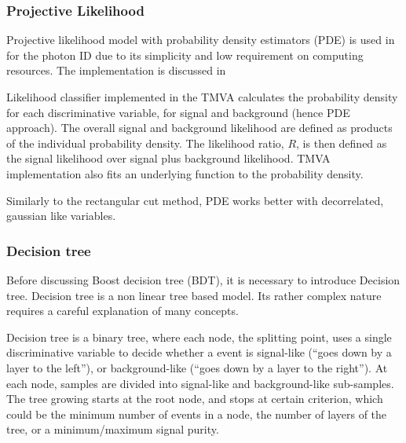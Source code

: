 \subsubsection{Projective Likelihood}
\label{sec:pandoraLikelihood}

Projective likelihood model with probability density estimators (PDE) is used in \pandora for the photon ID  due to its simplicity and low requirement on computing resources. The \pandora implementation is discussed  in 

Likelihood classifier implemented in the TMVA calculates the probability density for each discriminative variable, for signal and background (hence PDE approach). The overall signal and background likelihood are defined as products of the individual probability density. The likelihood ratio, $R$, is then defined as the signal likelihood over signal plus background likelihood. TMVA implementation also fits an underlying function to the probability density.


Similarly to the rectangular cut method, PDE works better with decorrelated, gaussian like variables.



\subsubsection{Decision tree}
\label{sec:pandoraDecisionTree}

Before discussing Boost decision tree (BDT), it is necessary to introduce Decision tree. Decision tree is a non linear tree based model. Its rather complex nature requires a careful explanation of many concepts.

Decision tree is a binary tree, where each node, the splitting point, uses a single discriminative variable to decide whether a event is signal-like (``goes down by a layer to the left''), or background-like (``goes down by a layer to the right''). At each node, samples are divided into signal-like and background-like sub-samples. The tree growing starts at the root node, and stops at certain criterion, which could be the minimum number of events in a node, the number of layers of the tree, or a minimum/maximum signal purity.


